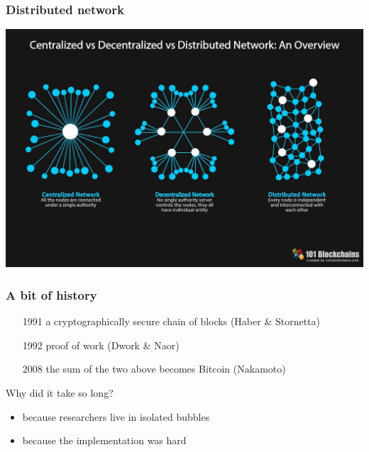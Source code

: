 \documentclass[11pt]{beamer}  %
\begin{document}
\begin{frame}\frametitle{Distributed network}

  \begin{center}
    \includegraphics[scale=0.22,clip=false]{pictures/distributed.jpg}
  \end{center}

\end{frame}

\begin{frame}\frametitle{A bit of history}

  \begin{itemize}
  \item[1991] a cryptographically secure chain of blocks (Haber \& Stornetta)
  \item[1992] proof of work (Dwork \& Naor)
  \item[2008] the sum of the two above becomes Bitcoin (Nakamoto)
  \end{itemize}

  \bigskip

  \begin{greenbox}{Why did it take so long?}
    \begin{itemize}
    \item because researchers live in isolated bubbles
    \item because the implementation was hard
    \end{itemize}
  \end{greenbox}

\end{frame}
\end{document}
